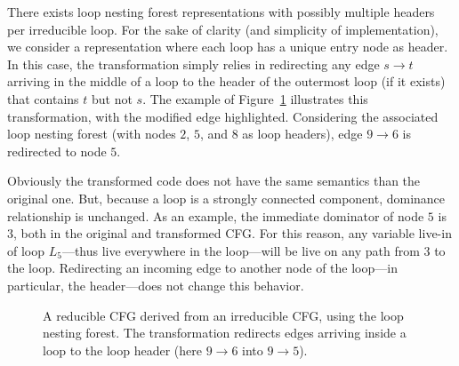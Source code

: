 There exists loop nesting forest representations with possibly multiple headers 
per irreducible loop.
For the sake of clarity (and simplicity of implementation), we consider a representation where each loop has a unique entry node as header.
In this case, the transformation simply relies in redirecting any edge $s\rightarrow t$ arriving in the middle of a loop to the header of the outermost loop (if it exists) that contains $t$ but not $s$.
The example of Figure~\ref{fig:examplecfg} illustrates this transformation, with the modified edge highlighted.
Considering the associated loop nesting forest (with nodes $2$, $5$, and $8$ as loop headers), edge $9\rightarrow 6$ is redirected to node $5$.

Obviously the transformed code does not have the same semantics than the original one.
But, because a loop is a strongly connected component, dominance relationship is unchanged.
As an example, the immediate dominator of node $5$ is $3$, both in the original and transformed CFG.
For this reason, any variable live-in of loop $L_5$---thus live everywhere in the loop---will be live on any path from $3$ to the loop.
Redirecting an incoming edge to another node of the loop---in particular, the header---does not change this behavior.

\begin{figure}[t]
  \begin{center}
    \hfill
    \hfill
  \end{center}
  \caption{%
	  A reducible CFG derived from an irreducible CFG, using the loop nesting forest.
	  The transformation redirects edges arriving inside a loop to the loop header (here $9\rightarrow 6$ into $9\rightarrow 5$).}
  \label{fig:examplecfg}
\end{figure}


